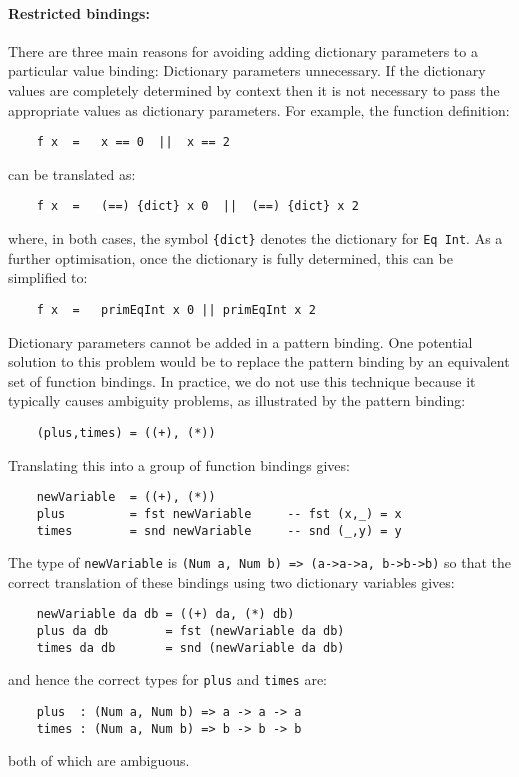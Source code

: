 \paragraph{Restricted bindings:}
There are three main reasons for avoiding adding dictionary  parameters
to a particular value binding:
\BI
\IT  Dictionary parameters unnecessary.  If the dictionary  values  are
     completely determined by context then it is not necessary to  pass
     the appropriate values as dictionary parameters.  For example, the
     function definition:
\begin{verbatim}
    f x  =   x == 0  ||  x == 2
\end{verbatim}
     can be translated as:
\begin{verbatim}
    f x  =   (==) {dict} x 0  ||  (==) {dict} x 2
\end{verbatim}
     where, in both cases, the symbol \verb"{dict}" denotes the dictionary for
     \verb"Eq Int".  As a further optimisation, once the dictionary  is  fully
     determined, this can be simplified to:
\begin{verbatim}
    f x  =   primEqInt x 0 || primEqInt x 2
\end{verbatim}
\IT  Dictionary parameters cannot be added in a pattern  binding.   One
     potential solution to this problem would be to replace the pattern
     binding by an equivalent set of function bindings.   In  practice,
     we do not use this technique because it typically causes ambiguity
     problems, as illustrated by the pattern binding:
\begin{verbatim}
    (plus,times) = ((+), (*))
\end{verbatim}
     Translating this into a group of function bindings gives:
\begin{verbatim}
    newVariable  = ((+), (*))
    plus         = fst newVariable     -- fst (x,_) = x
    times        = snd newVariable     -- snd (_,y) = y
\end{verbatim}
     The type of \verb"newVariable" is 
     \verb"(Num a, Num b) => (a->a->a, b->b->b)" so
     that  the  correct  translation  of  these  bindings   using   two
     dictionary variables gives:
\begin{verbatim}
    newVariable da db = ((+) da, (*) db)
    plus da db        = fst (newVariable da db)
    times da db       = snd (newVariable da db)
\end{verbatim} 
     and hence the correct types for \verb"plus" and \verb"times" are:
\begin{verbatim} 
    plus  : (Num a, Num b) => a -> a -> a
    times : (Num a, Num b) => b -> b -> b
\end{verbatim}   
     both of which are ambiguous.

